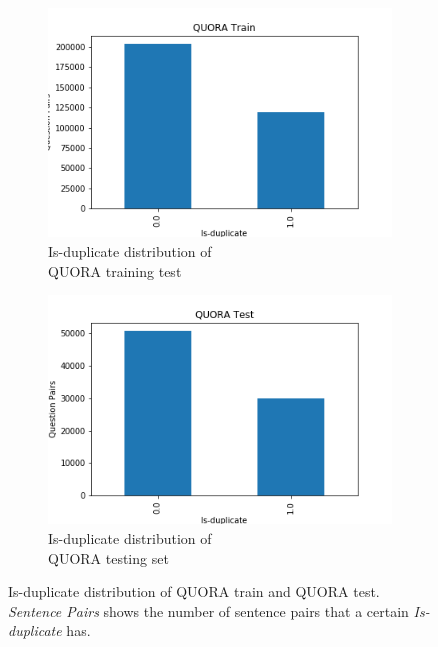 \begin{enumerate}
 \begin{figure}
 	\captionsetup[subfigure]{justification=centering}
 	\centering
 	\begin{subfigure}[b]{.5\textwidth}
 		\centering
 		\includegraphics[width=\textwidth]{figures/semantic_textual_similarity/introduction/quora_train.png}
 		\caption{Is-duplicate distribution of \\ QUORA training test}
 		\label{fig:quora_train_is_duplicate}
 	\end{subfigure}%
 	\begin{subfigure}[b]{.5\textwidth}
 		\centering
 		\includegraphics[width=\textwidth]{figures/semantic_textual_similarity/introduction/quora_test.png}
 		\caption{Is-duplicate distribution of \\ QUORA testing set}
 		\label{fig:quora_test_is_duplicate}
 	\end{subfigure}
 	\caption[Is-duplicate distribution of QUORA train and QUORA test]{Is-duplicate distribution of QUORA train and QUORA test. \textit{Sentence Pairs} shows the number of sentence pairs that a certain \textit{Is-duplicate} has.}
 	\label{fig:quora_is_duplicate}
 \end{figure}
   


\end{enumerate}
